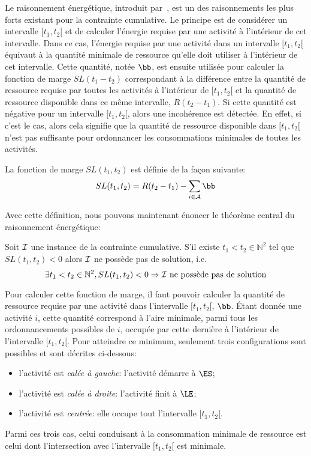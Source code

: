 Le raisonnement énergétique, introduit par~\cite{RELopez}, est un des
raisonnements les plus forts existant pour la contrainte
cumulative. Le principe est de considérer un intervalle $[t_1,t_2[$ et
de calculer l'énergie requise par une activité à l'intérieur de cet
intervalle. Dans ce cas, l'énergie requise par une activité dans un
intervalle $[t_1,t_2[$  équivaut à
la quantité minimale de ressource qu'elle doit utiliser
à l'intérieur de cet intervalle. Cette quantité, notée $\bb$, est
ensuite utilisée pour calculer la fonction de marge $SL(t_1-t_2)$
correspondant à la différence entre la quantité de ressource requise
par toutes les activités à l'intérieur de $[t_1,t_2[$ et la quantité
de ressource disponible dans ce même intervalle, $R (t_2-t_1)$. Si
cette quantité est négative pour un intervalle $[t_1,t_2[$, alors une
incohérence est détectée. En effet, si c'est le cas, alors cela
signifie que la quantité de ressource disponible dans $[t_1,t_2[$
n'est pas suffisante pour ordonnancer les consommations minimales de
toutes les activités.

\begin{defi}
La fonction de marge $SL(t_1,t_2)$ est définie de la façon suivante: 
\[  SL(t_1,t_2) = R (t_2-t_1) - \sum_{i \in \A} \bb \]
\end{defi}

Avec cette définition, nous pouvons maintenant énoncer le théorème
central du raisonnement énergétique:
 
\begin{theo}
\label{th:centerRE}
Soit ${\cal I}$ une instance de la contrainte cumulative. S'il existe
$t_1 < t_2 \in \mathbb{N}^2$ tel que $SL(t_1,t_2) <0$ alors ${\cal I}$ ne
possède pas de solution, i.e.
\begin{equation}
\exists t_1 < t_2 \in \mathbb{N}^2 , SL(t_1,t_2) <0 \Rightarrow {\cal I}
\text{ ne possède pas de solution}
\label{eq:centerRE}
\end{equation}
\end{theo}

Pour calculer cette fonction de marge, il faut pouvoir calculer la
quantité de ressource requise par une activité dans l'intervalle
$[t_1,t_2[$, $\bb$. {\'E}tant donnée une activité $i$, cette quantité
correspond à l'aire minimale, parmi tous les ordonnancements possibles
de $i$, occupée par cette dernière à l'intérieur de l'intervalle
$[t_1,t_2[$. Pour atteindre ce minimum, seulement trois configurations
sont possibles et sont décrites ci-dessous:
\begin{itemize}
\item l'activité est {\it calée à gauche}: l'activité démarre à $\ES$; 
\item l'activité est {\it  calée à droite}: l'activité finit à $\LE$;
\item l'activité est {\it centrée}: elle occupe tout l'intervalle
  $[t_1,t_2[$.
\end{itemize}
Parmi ces trois cas, celui conduisant à la consommation minimale de
ressource est celui dont l'intersection avec l'intervalle $[t_1,t_2[$
est minimale.

